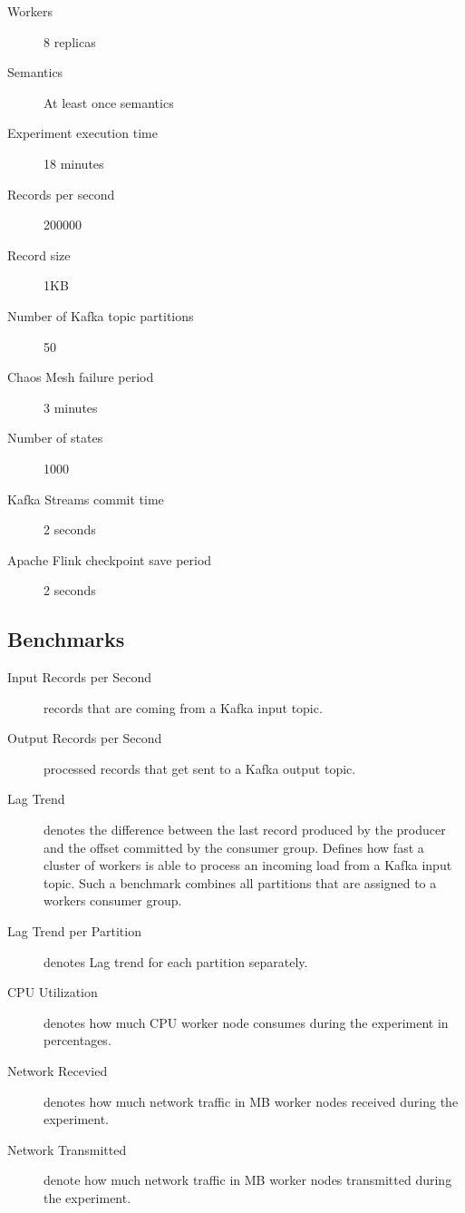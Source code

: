 \begin{description}
    \item[Workers] 8 replicas
    \item[Semantics] At least once semantics
    \item[Experiment execution time] 18 minutes
    \item[Records per second] 200000
    \item[Record size] 1KB
    \item[Number of Kafka topic partitions] 50
    \item[Chaos Mesh failure period] 3 minutes
    \item[Number of states] 1000
    \item[Kafka Streams commit time] 2 seconds
    \item[Apache Flink checkpoint save period] 2 seconds
\end{description}



\subsection{Benchmarks}\label{subsec:definition-of-benchmarks}

\begin{description}
    \item[Input Records per Second] records that are coming from a Kafka input topic.
    \item[Output Records per Second] processed records that get sent to a Kafka output topic.
    \item[Lag Trend] denotes the difference between the last record produced by the producer and the offset committed by the consumer group.
    Defines how fast a cluster of workers is able to process an incoming load from a Kafka input topic.
    Such a benchmark combines all partitions that are assigned to a workers consumer group.
    \item[Lag Trend per Partition] denotes Lag trend for each partition separately.
    \item[CPU Utilization] denotes how much CPU worker node consumes during the experiment in percentages.
    \item[Network Recevied] denotes how much network traffic in MB worker nodes received during the experiment.
    \item[Network Transmitted] denote how much network traffic in MB worker nodes transmitted during the experiment.
\end{description}

